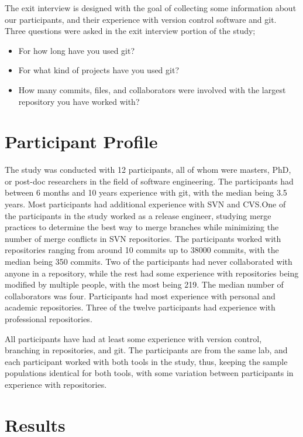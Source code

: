 The exit interview is designed with the goal of collecting some
information about our participants, and their experience with version
control software and git. Three questions were asked in the exit
interview portion of the study;

\begin{itemize}
  \item For how long have you used git?
  \item For what kind of projects have you used git?
  \item How many commits, files, and collaborators were involved with
    the largest repository you have worked with?
\end{itemize}

\section{Participant Profile}\label{sec:participant_profile}

The study was conducted with 12 participants, all of whom were masters,
PhD, or post-doc researchers in the field of software engineering. The
participants had between 6 months and 10 years experience with git, with
the median being 3.5 years. Most participants had additional experience
with SVN and CVS.\@ One of the participants in the study worked as a
release engineer, studying merge practices to determine the best way to
merge branches while minimizing the number of merge conflicts in SVN
repositories. The participants worked with repositories ranging from
around 10 commits up to 38000 commits, with the median being 350
commits. Two of the participants had never collaborated with anyone in a
repository, while the rest had some experience with repositories being
modified by multiple people, with the most being 219. The median number
of collaborators was four. Participants had most experience with
personal and academic repositories. Three of the twelve participants had
experience with professional repositories.

All participants have had at least some experience with version control,
branching in repositories, and git. The participants are from the same
lab, and each participant worked with both tools in the study, thus,
keeping the sample populations identical for both tools, with some
variation between participants in experience with repositories.

\section{Results}
\label{sec:results}

